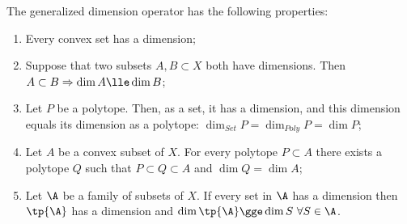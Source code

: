 \documentclass[12pt, a4paper]{article}
\begin{document}
\begin{proposition}\label{set-dim}
    The generalized dimension operator has the following properties:

    \begin{enumerate}
        \item Every convex set has a dimension;
        
        \item Suppose that two subsets \(A, B \subset X\) both have dimensions. Then \(A \subset B \Rightarrow \dim A \lle \dim B\);
        
        \item Let \(P\) be a polytope. Then, as a set, it has a dimension, and this dimension equals its dimension as a polytope: \(\dim_{Set} P = \dim_{Poly} P = \dim P\);
        
        \item Let \(A\) be a convex subset of \(X\). For every polytope \(P \subset A\) there exists a polytope \(Q\) such that \(P \subset Q \subset A\) and \(\dim Q = \dim A\);
        
        \item Let \(\A\) be a family of subsets of \(X\). If every set in \(\A\) has a dimension then \(\tp{\A}\) has a dimension and \(\dim{\tp{\A}} \gge \dim S \ \forall S \in \A\). 
    \end{enumerate}
\end{proposition}
\end{document}
